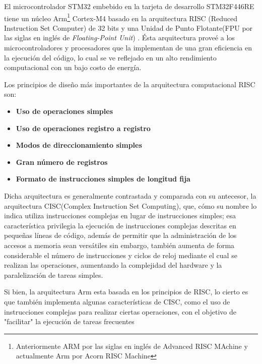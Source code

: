 El microcontrolador STM32 embebido en la tarjeta de desarrollo STM32F446RE tiene un núcleo Arm\footnote{Anteriormente ARM por las siglas en inglés de Advanced RISC MAchine y actualmente Arm por Acorn RISC Machine} Cortex-M4 basado en la  arquitectura RISC (Reduced Instruction Set Computer) de 32 bits y una Unidad de Punto Flotante(FPU por las siglas en inglés de \textit{Floating-Point Unit}) \citep*{STMicroelectronics2020}. Ésta arquitectura proveé a los microcontroladores y procesadores que la implementan de una gran eficiencia en la ejecución del código, lo cual se ve reflejado en un alto rendimiento computacional con un bajo costo de energía.


Los principios de diseño más importantes de la arquitectura computacional RISC son:

\begin{itemize}
    \item \textbf{Uso de operaciones simples}
    \item \textbf{Uso de operaciones registro a registro}
    \item \textbf{Modos de direccionamiento simples}
    \item \textbf{Gran número de registros}
    \item \textbf{Formato de instrucciones simples de longitud fija}
\end{itemize}

Dicha arquitectura es generalmente contrastada y comparada con su antecesor, la arquitectura CISC(Complex Instruction Set Computing), que, cómo su nombre lo indica utiliza instrucciones complejas en lugar de instrucciones simples; esa característica privilegia la ejecución de instrucciones complejas descritas en pequeñas líneas de código, además de permitir que la administración de los accesos a memoria sean versátiles sin embargo, también aumenta de forma considerable el número de instrucciones y ciclos de reloj mediante el cual se realizan las operaciones, aumentando la complejidad del hardware y la paralelización de tareas simples.

Si bien, la arquitectura Arm esta basada en los principios de RISC, lo cierto es que también implementa algunas características de CISC, como el uso de instrucciones complejas para realizar ciertas operaciones, con el objetivo de "facilitar" la ejecución de tareas frecuentes



